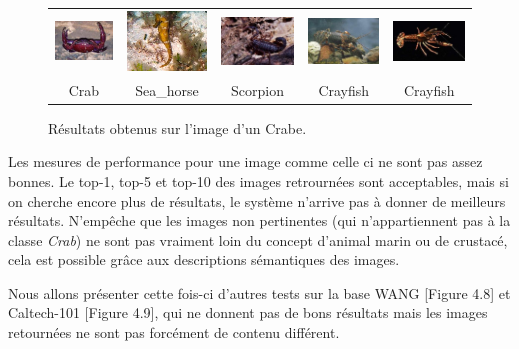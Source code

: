 \begin{figure}[H]
\begin{tabular}{ccccc}
\includegraphics[width=3cm]{Figures/crab/16.jpg}
&
\includegraphics[width=3cm]{Figures/crab/17.jpg}
&
\includegraphics[width=3cm]{Figures/crab/18.jpg}
&
\includegraphics[width=3cm]{Figures/crab/19.jpg}
&
\includegraphics[width=3cm]{Figures/crab/20.jpg}\\
Crab & Sea\_horse & Scorpion & Crayfish & Crayfish\\

\end{tabular}
\caption[comp7]{Résultats obtenus sur l'image d'un Crabe.}
\end{figure}

	Les mesures de performance pour une image comme celle ci ne sont pas assez bonnes. Le top-1, top-5 et top-10 des images retrournées sont acceptables, mais si on cherche encore plus de résultats, le système n'arrive pas à donner de meilleurs résultats. N’empêche que les images non pertinentes (qui n'appartiennent pas à la classe \textit{Crab}) ne sont pas vraiment loin du concept d'animal marin ou de crustacé, cela est possible grâce aux descriptions sémantiques des images.
	
	Nous allons présenter cette fois-ci d'autres tests sur la base WANG [Figure 4.8] et Caltech-101 [Figure 4.9], qui ne donnent pas de bons résultats mais les images retournées ne sont pas forcément de contenu différent.
	
